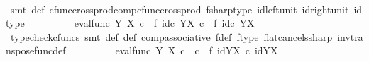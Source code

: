 \begin{isabellebody}
\ \ \ \ \ \ \isamarkupfalse%
\ {\isacharparenleft}{\kern0pt}smt\ {\isasymphi}{\isacharunderscore}{\kern0pt}def\ cfunc{\isacharunderscore}{\kern0pt}cross{\isacharunderscore}{\kern0pt}prod{\isacharunderscore}{\kern0pt}comp{\isacharunderscore}{\kern0pt}cfunc{\isacharunderscore}{\kern0pt}cross{\isacharunderscore}{\kern0pt}prod\ fsharp{\isacharunderscore}{\kern0pt}type\ id{\isacharunderscore}{\kern0pt}left{\isacharunderscore}{\kern0pt}unit{}\ id{\isacharunderscore}{\kern0pt}right{\isacharunderscore}{\kern0pt}unit{}\ id{\isacharunderscore}{\kern0pt}type{\isacharparenright}{\kern0pt}\isanewline
\ \ \ \ \isamarkupfalse%
\ \isamarkupfalse%
\ {\isachardoublequoteopen}{\isachardot}{\kern0pt}{\isachardot}{\kern0pt}{\isachardot}{\kern0pt}\ {\isacharequal}{\kern0pt}\ eval{\isacharunderscore}{\kern0pt}func\ Y\ X\ {\isasymcirc}\isactrlsub c\ {\isacharparenleft}{\kern0pt}{\isasympsi}\ {\isasymtimes}\isactrlsub f\ id\isactrlsub c\ {\isacharparenleft}{\kern0pt}Y\isactrlbsup X\isactrlesup {\isacharparenright}{\kern0pt}{\isacharparenright}{\kern0pt}\ {\isasymcirc}\isactrlsub c\ {\isacharparenleft}{\kern0pt}{\isasymphi}\ {\isasymtimes}\isactrlsub f\ id\isactrlsub c\ {\isacharparenleft}{\kern0pt}Y\isactrlbsup X\isactrlesup {\isacharparenright}{\kern0pt}{\isacharparenright}{\kern0pt}{\isachardoublequoteclose}\isanewline
\ \ \ \ \ \ \isamarkupfalse%
\ {\isacharparenleft}{\kern0pt}typecheck{\isacharunderscore}{\kern0pt}cfuncs{\isacharcomma}{\kern0pt}\ smt\ {\isasymphi}{\isacharunderscore}{\kern0pt}def\ {\isasympsi}{\isacharunderscore}{\kern0pt}def\ comp{\isacharunderscore}{\kern0pt}associative{}\ f{\isacharunderscore}{\kern0pt}def\ f{\isacharunderscore}{\kern0pt}type\ flat{\isacharunderscore}{\kern0pt}cancels{\isacharunderscore}{\kern0pt}sharp\ inv{\isacharunderscore}{\kern0pt}transpose{\isacharunderscore}{\kern0pt}func{\isacharunderscore}{\kern0pt}def{}{\isacharparenright}{\kern0pt}\isanewline
\ \ \ \ \isamarkupfalse%
\ \isamarkupfalse%
\ {\isachardoublequoteopen}{\isachardot}{\kern0pt}{\isachardot}{\kern0pt}{\isachardot}{\kern0pt}\ {\isacharequal}{\kern0pt}\ eval{\isacharunderscore}{\kern0pt}func\ Y\ X\ {\isasymcirc}\isactrlsub c\ {\isacharparenleft}{\kern0pt}{\isacharparenleft}{\kern0pt}{\isasympsi}\ {\isasymcirc}\isactrlsub c\ {\isasymphi}{\isacharparenright}{\kern0pt}\ {\isasymtimes}\isactrlsub f\ {\isacharparenleft}{\kern0pt}id{\isacharparenleft}{\kern0pt}Y\isactrlbsup X\isactrlesup {\isacharparenright}{\kern0pt}\ {\isasymcirc}\isactrlsub c\ id{\isacharparenleft}{\kern0pt}Y\isactrlbsup X\isactrlesup {\isacharparenright}{\kern0pt}{\isacharparenright}{\kern0pt}{\isacharparenright}{\kern0pt}{\isachardoublequoteclose}\isanewline

\end{isabellebody}
